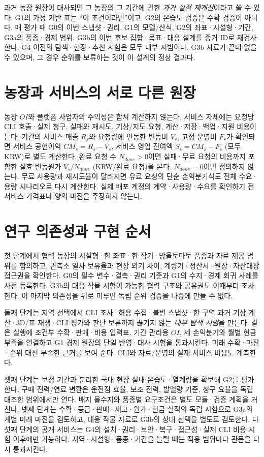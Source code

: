 \documentclass[11pt,a4paper]{article}
\newcommand{\hold}{\textsf{판단 보류}}
\begin{document}
과거 농장 원장이 대사되면 그 농장의 그 기간에 관한 \emph{과거 실적 재계산}이라고 쓸 수 있다. G1의 가정 기반 표는 ``이 조건이라면''이고, G2의 온습도 검증은 수확 검증이 아니다. 매 평가 때 G0의 이번 스냅샷·권리, G1의 모델/산식, G2의 좌표·시설형·기간, G3a의 품종·경제 범위, G3b의 이번 후보 집합·목표·대응 설계를 증거 ID로 재검사한다. G4 이전의 탐색·현장·추천 시험은 모두 내부 시범이다. G3b 자료가 끝내 없을 수 있으며, 그 경우 순위를 보류하는 것이 이 설계의 정상 결과다.

\section{농장과 서비스의 서로 다른 원장}
농장 $OI$와 플랫폼 사업자의 수익성은 합쳐 계산하지 않는다. 서비스 자체에는 요청당 CLI 호출·실제 청구, 실패와 재시도, 기상/지도 요청, 계산·저장·백업·지원 비용이 든다. 기간의 서비스 매출 $R_s$와 요청량에 연동한 변동비 $V_s$, 고정 운영비 $F_s$가 확인되면 서비스 공헌이익 $CM_s=R_s-V_s$, 서비스 영업 잔여액 $S_s=CM_s-F_s$ (모두 KRW)로 별도 계산한다. 완료 요청 수 $N_{done}>0$이면 실패·무료 요청의 비용까지 포함한 실효 변동원가 $V_s/N_{done}$ (KRW/완료 요청)을 본다. $N_{done}=0$이면 정의하지 않는다. 무료 사용량과 재시도율이 달라지면 유료 요청의 단순 손익분기식도 전체 수요·용량 시나리오로 다시 계산한다. 실제 배포 계정의 계약·사용량·수요를 확인하기 전 서비스 가격표나 양의 마진을 주장하지 않는다.

\section{연구 의존성과 구현 순서}
첫 단계에서 협력 농장의 시설형·한 좌표·한 작기·방울토마토 품종과 자료 제공 범위를 합의하고, 관측소 일사 보유율과 현장 외기 차이, 계량기·정산서·원장·자산대장 접근권을 확인한다. G0의 필수 변수·결측·권리 기준과 G1의 수지·경제 회귀 사례를 사전 등록한다. G3b의 대응 작물 시험이 가능한 협력 구조와 공유권도 이때부터 조사한다. 이 마지막 의존성을 뒤로 미루면 독립 순위 검증을 나중에 만들 수 없다.

둘째 단계는 지역 선택에서 CLI 조사·허용 수집·불변 스냅샷·한 구역 과거 기상 계산·3D/표 재생·CLI 평가와 \hold 까지 끊기지 않는 \emph{내부 탐색 시범}을 만든다. 같은 실행에 조건부 수확·판매·비용 입력표, 기간 관리용 $OI$, 세 손익분기와 월별 현금 부족을 연결하고 G1 경제 원장의 단일 반영·대사 시험을 통과시킨다. 미래 수확·마진·순위 대신 부족한 근거를 보여 준다. CLI와 자료/운영의 실제 서비스 비용도 계측한다.

셋째 단계는 보정 기간과 분리한 국내 현장 실내 온습도·열계량을 확보해 G2를 평가한다. 구매 전력/연료 변환은 운전점 효율, 보조 전력, 발열량 기준, 청구 요율을 독립 대조한 범위에서만 연다. 배지 물수지와 품종별 요구조건은 별도 모듈·검증 계획을 거친다. 넷째 단계는 수확·등급·판매·재고·원가·현금 실적의 독립 시험으로 G3a의 개별 미래 마진을 검토하고, 대응 작물 자료로 G3b의 상대 선택을 별도로 검토한다. 다섯째 단계의 공개 서비스는 G4의 설치·권리·보안·복구·접근성·실제 CLI 비용 시험 이후에만 가능하다. 지역·시설형·품종·기간을 늘릴 때는 적용 범위마다 관문을 다시 통과시킨다.
\end{document}
